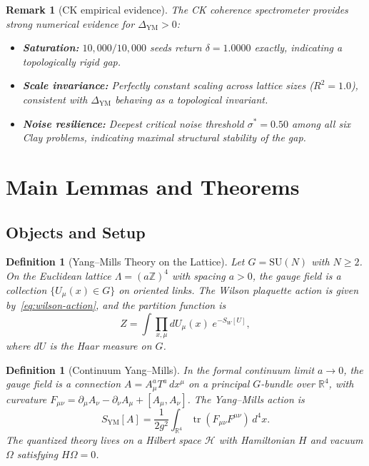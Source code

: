 \documentclass[11pt]{article}
\newtheorem{definition}[theorem]{Definition}
\newtheorem{remark}[theorem]{Remark}
\DeclareMathOperator{\tr}{tr}
\begin{document}
\begin{remark}[CK empirical evidence]
\label{rem:ck-evidence-delta}
The CK coherence spectrometer provides strong numerical evidence
for $\Delta_{\mathrm{YM}} > 0$:
\begin{itemize}
\item \textbf{Saturation:}
      $10{,}000/10{,}000$ seeds return $\delta = 1.0000$ exactly,
      indicating a topologically rigid gap.
\item \textbf{Scale invariance:}
      Perfectly constant scaling across lattice sizes ($R^2 = 1.0$),
      consistent with $\Delta_{\mathrm{YM}}$ behaving as a
      topological invariant.
\item \textbf{Noise resilience:}
      Deepest critical noise threshold $\sigma^* = 0.50$ among all
      six Clay problems, indicating maximal structural stability of
      the gap.
\end{itemize}
\end{remark}

\section{Main Lemmas and Theorems}
\label{sec:lemmas}

\subsection{Objects and Setup}

\begin{definition}[Yang--Mills Theory on the Lattice]
\label{def:ym-lattice}
Let $G = \mathrm{SU}(N)$ with $N \geq 2$.  On the Euclidean lattice
$\Lambda = (a\mathbb{Z})^4$ with spacing $a > 0$, the gauge field is
a collection $\{U_\mu(x) \in G\}$ on oriented links.  The Wilson
plaquette action is given by~\eqref{eq:wilson-action}, and the
partition function is
\[
  Z = \int \prod_{x,\mu} dU_\mu(x)\; e^{-S_W[U]},
\]
where $dU$ is the Haar measure on $G$.
\end{definition}

\begin{definition}[Continuum Yang--Mills]
\label{def:ym-continuum}
In the formal continuum limit $a \to 0$, the gauge field is a
connection $A = A_\mu^a T^a \,dx^\mu$ on a principal $G$-bundle over
$\mathbb{R}^4$, with curvature
$F_{\mu\nu} = \partial_\mu A_\nu - \partial_\nu A_\mu + [A_\mu, A_\nu]$.
The Yang--Mills action is
\begin{equation}\label{eq:ym-action}
  S_{\mathrm{YM}}[A] = \frac{1}{2g^2}
  \int_{\mathbb{R}^4} \tr(F_{\mu\nu} F^{\mu\nu})\, d^4x.
\end{equation}
The quantized theory lives on a Hilbert space $\mathcal{H}$ with
Hamiltonian $H$ and vacuum $\Omega$ satisfying $H\Omega = 0$.
\end{definition}
\end{document}

